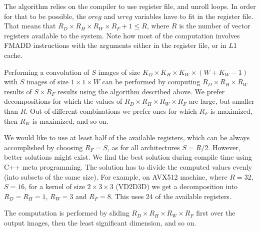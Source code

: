   The algorithm relies on the compiler to use register file, and
  unroll loops.  In order for that to be possible, the $oreg$ and
  $wreg$ variables have to fit in the register file.  That means that
  $R_D \times R_H \times R_W \times R_F + 1 \le R$, where $R$ is the
  number of vector registers available to the system.  Note how most
  of the computation involves FMADD instructions with the arguments
  either in the register file, or in $L1$ cache.

  Performing a convolution of $S$ images of size $K_D \times K_H
  \times K_W \times (W+K_W-1)$ with $S$ images of size $1 \times 1
  \times W$ can be performed by computing $R_D \times R_H \times R_W$
  results of $S \times R_F$ results using the algorithm described
  above.  We prefer decompositions for which the values of $R_D \times
  R_H \times R_W \times R_F$ are large, but smaller than $R$.  Out of
  different combinations we prefer ones for which $R_F$ is maximized,
  then $R_W$ is maximized, and so on.

  We would like to use at least half of the available registers, which
  can be always accomplished by choosing $R_F = S$, as for all
  architectures $S = R/2$.  However, better solutions might exist.  We
  find the best solution during compile time using C++ meta
  programming.  The solution has to divide the computed values evenly
  (into subsets of the same size).  For example, on AVX512 machine,
  where $R=32$, $S=16$, for a kernel of size $2 \times 3 \times 3$
  (VD2D3D) we get a decomposition into $R_D=R_H=1$, $R_W=3$ and
  $R_F=8$.  This uses 24 of the available registers.

  The computation is performed by sliding $R_D \times R_H \times R_W
  \times R_F$ first over the output images, then the least significant
  dimension, and so on.


